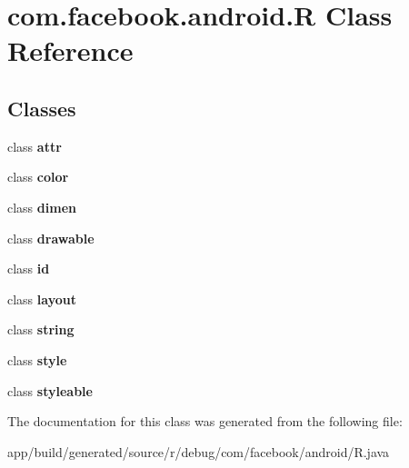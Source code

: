 \section{com.\+facebook.\+android.\+R Class Reference}
\label{classcom_1_1facebook_1_1android_1_1_r}
\subsection*{Classes}
\begin{DoxyCompactItemize}
\item 
class {\bfseries attr}
\item 
class {\bfseries color}
\item 
class {\bfseries dimen}
\item 
class {\bfseries drawable}
\item 
class {\bfseries id}
\item 
class {\bfseries layout}
\item 
class {\bfseries string}
\item 
class {\bfseries style}
\item 
class {\bfseries styleable}
\end{DoxyCompactItemize}


The documentation for this class was generated from the following file\+:\begin{DoxyCompactItemize}
\item 
app/build/generated/source/r/debug/com/facebook/android/R.\+java\end{DoxyCompactItemize}
